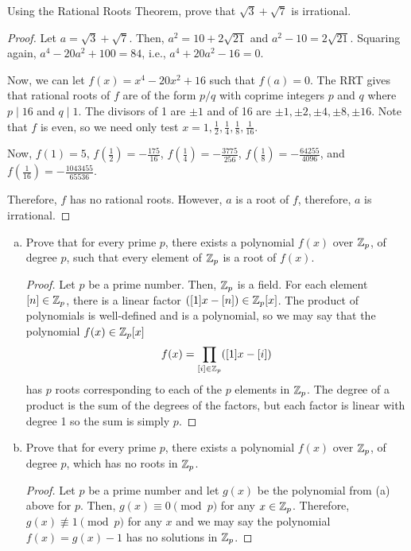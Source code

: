 \begin{recommended}
  Using the Rational Roots Theorem, prove that $\sqrt 3 + \sqrt 7$ is irrational.
\end{recommended}
\begin{proof}
  Let $a = \sqrt 3 + \sqrt 7$.
  Then, $a^2 = 10 + 2\sqrt{21}$ and $a^2 - 10 = 2\sqrt{21}$.
  Squaring again, $a^4 - 20a^2 + 100 = 84$, i.e., $a^4 + 20a^2 - 16 = 0$.

  Now, we can let $f(x) = x^4 - 20x^2 + 16$ such that $f(a) = 0$.
  The RRT gives that rational roots of $f$ are of the form $p/q$ with coprime integers $p$ and $q$
  where $p \mid 16$ and $q \mid 1$. The divisors of 1 are $\pm1$ and of 16 are $\pm1,\pm2,\pm4,\pm8,\pm16$.
  Note that $f$ is even, so we need only test $x=1,\frac12,\frac14,\frac18,\frac1{16}$.

  Now, $f(1)=5$, $f(\frac12)=-\frac{175}{16}$, $f(\frac14)=-\frac{3775}{256}$,
  $f(\frac18)=-\frac{64255}{4096}$, and $f(\frac1{16})=-\frac{1043455}{65536}$.

  Therefore, $f$ has no rational roots. However, $a$ is a root of $f$, therefore, $a$ is irrational.
\end{proof}


\begin{recommended}
\end{recommended}
\begin{enumerate}[(a)]
  \item Prove that for every prime $p$, there exists a polynomial $f(x)$ over $\mathbb{Z}_p$,
        of degree $p$, such that every element of $\mathbb{Z}_p$ is a root of $f(x)$.
        \begin{proof}
          Let $p$ be a prime number.
          Then, $\mathbb{Z}_p$ is a field.
          For each element $[n] \in \mathbb{Z}_p$, there is a linear factor $([1]x - [n]) \in \mathbb{Z}_p[x]$.
          The product of polynomials is well-defined and is a polynomial, so we may say that
          the polynomial $f(x) \in \mathbb{Z}_p[x]$ \[ f(x) = \prod_{[i] \in \mathbb{Z}_p}([1]x - [i]) \]
          has $p$ roots corresponding to each of the $p$ elements in $\mathbb{Z}_p$.
          The degree of a product is the sum of the degrees of the factors,
          but each factor is linear with degree 1 so the sum is simply $p$.
        \end{proof}
  \item Prove that for every prime $p$, there exists a polynomial $f(x)$ over $\mathbb{Z}_p$,
        of degree $p$, which has no roots in $\mathbb{Z}_p$.
        \begin{proof}
          Let $p$ be a prime number and let $g(x)$ be the polynomial from (a) above for $p$.
          Then, $g(x) \equiv 0 \pmod p$ for any $x \in \mathbb{Z}_p$.
          Therefore, $g(x) \not\equiv 1 \pmod p$ for any $x$ and we may say the polynomial
          $f(x) = g(x) - 1$ has no solutions in $\mathbb{Z}_p$.
        \end{proof}
\end{enumerate}


